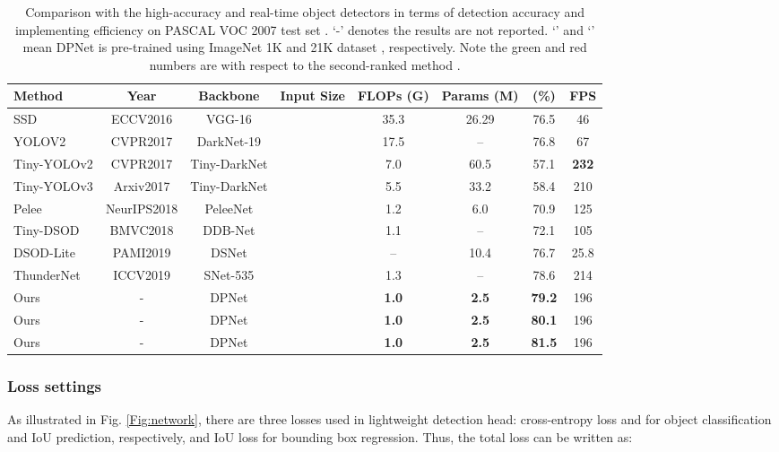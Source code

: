 \documentclass[lettersize,journal]{IEEEtran}
\begin{document}
\begin{table*}[t!] 
	\tabcolsep 4.0mm \caption{Comparison with the high-accuracy and real-time object detectors in terms of detection accuracy and implementing efficiency on PASCAL VOC 2007 test set \cite{everingham2010pascal}. ‘-’ denotes the results are not reported. ‘’ and ‘’ mean DPNet is pre-trained using ImageNet 1K and 21K dataset \cite{deng2009imagenet}, respectively. Note the green and red numbers are with respect to the second-ranked method \cite{qin2019thundernet}.} 
	\begin{center}
		\begin{tabular}{l|c|c|c|c|c|c|c}
			\toprule Method&Year&Backbone&Input Size&FLOPs (G) & Params (M) & (\%) & FPS\\
\midrule
			SSD\cite{liu2016ssd}&ECCV2016&VGG-16&  &35.3&26.29&76.5&46\\
			YOLOV2 \cite{redmon2017yolo9000} &CVPR2017& DarkNet-19 &&17.5&--&76.8&67\\
\midrule
			Tiny-YOLOv2\cite{redmon2017yolo9000} &CVPR2017&Tiny-DarkNet& & 7.0&60.5&57.1&\textbf{232} \\
			Tiny-YOLOv3\cite{redmon2018yolov3} &Arxiv2017&Tiny-DarkNet& & 5.5&33.2&58.4&210 \\
Pelee \cite{Pelee} &NeurIPS2018 &PeleeNet&  &1.2 & 6.0 &70.9&125\\
			Tiny-DSOD \cite{li2018tiny}&BMVC2018 &DDB-Net&  &1.1 & -- &72.1& 105\\
DSOD-Lite\cite{shen2019object} &PAMI2019& DSNet &  & --&10.4&76.7&25.8\\
			ThunderNet \cite{qin2019thundernet}&ICCV2019&SNet-535&&1.3 & -- &78.6& 214\\
\midrule
			Ours &- &DPNet&&\textbf{1.0} & \textbf{2.5} & \textbf{79.2}  & 196\\	
			Ours &- &DPNet&&\textbf{1.0} & \textbf{2.5} & \textbf{80.1}  & 196\\
			Ours &- &DPNet&&\textbf{1.0} & \textbf{2.5} & \textbf{81.5}  & 196\\	
\bottomrule
		\end{tabular}\label{tab:det_result_pascal}
	\end{center}
\end{table*}


\subsubsection{Loss settings}
As illustrated in Fig. \ref{Fig:network}, there are three losses used in lightweight detection head: cross-entropy loss  and  for object classification and IoU prediction, respectively, and IoU loss  for bounding box regression. Thus, the total loss  can be written as:
\end{document}
